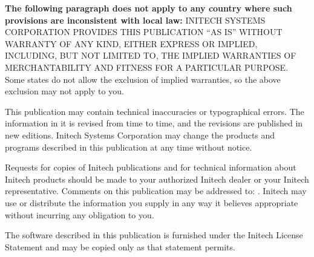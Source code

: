 \begin{TitleVerso}
\IsThisGoodForTheCompany\par
{\imLegalFont
\textbf{The following paragraph does not apply to any country where such
provisions are inconsistent with local law:} INITECH SYSTEMS CORPORATION
PROVIDES THIS PUBLICATION ``AS IS'' WITHOUT WARRANTY OF ANY KIND, EITHER
EXPRESS OR IMPLIED, INCLUDING, BUT NOT LIMITED TO, THE IMPLIED WARRANTIES OF
MERCHANTABILITY AND FITNESS FOR A PARTICULAR PURPOSE.  Some states do not
allow the exclusion of implied warranties, so the above exclusion may not
apply to you.\par
This publication may contain technical inaccuracies or typographical errors.
The information in it is revised from time to time, and the revisions are
published in new editions.  Initech Systems Corporation may change the
products and programs described in this publication at any time without
notice.\par
Requests for copies of Initech publications and for technical information
about Initech products should be made to your authorized Initech dealer or
your Initech representative.  Comments on this publication may be addressed
to: \InitechAddressLine.
Initech may use or distribute the information you supply in any way it
believes appropriate without incurring any obligation to you.\par
The software described in this publication is furnished under the Initech
License Statement and may be copied only as that statement permits.\par}
\end{TitleVerso}
